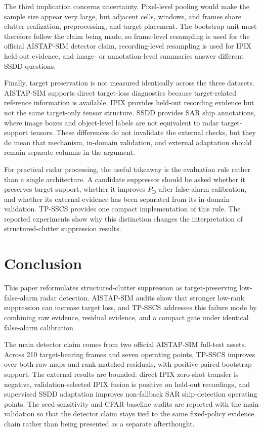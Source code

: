 \documentclass[journal]{IEEEtran}
\begin{document}
The third implication concerns uncertainty. Pixel-level pooling would make the sample size appear very large, but adjacent cells, windows, and frames share clutter realization, preprocessing, and target placement. The bootstrap unit must therefore follow the claim being made, so frame-level resampling is used for the official AISTAP-SIM detector claim, recording-level resampling is used for IPIX held-out evidence, and image- or annotation-level summaries answer different SSDD questions.

Finally, target preservation is not measured identically across the three datasets. AISTAP-SIM supports direct target-loss diagnostics because target-related reference information is available. IPIX provides held-out recording evidence but not the same target-only tensor structure. SSDD provides SAR ship annotations, where image boxes and object-level labels are not equivalent to radar target-support tensors. These differences do not invalidate the external checks, but they do mean that mechanism, in-domain validation, and external adaptation should remain separate columns in the argument.

For practical radar processing, the useful takeaway is the evaluation rule rather than a single architecture. A candidate suppressor should be asked whether it preserves target support, whether it improves $P_{\mathrm{D}}$ after false-alarm calibration, and whether its external evidence has been separated from its in-domain validation. TP-SSCS provides one compact implementation of this rule. The reported experiments show why this distinction changes the interpretation of structured-clutter suppression results.

\section{Conclusion}

This paper reformulates structured-clutter suppression as target-preserving low-false-alarm radar detection. AISTAP-SIM audits show that stronger low-rank suppression can increase target loss, and TP-SSCS addresses this failure mode by combining raw evidence, residual evidence, and a compact gate under identical false-alarm calibration.

The main detector claim comes from two official AISTAP-SIM full-test assets. Across 210 target-bearing frames and seven operating points, TP-SSCS improves over both raw maps and rank-matched residuals, with positive paired bootstrap support. The external results are bounded: direct IPIX zero-shot transfer is negative, validation-selected IPIX fusion is positive on held-out recordings, and supervised SSDD adaptation improves non-fallback SAR ship-detection operating points. The seed-sensitivity and CFAR-baseline audits are reported with the main validation so that the detector claim stays tied to the same fixed-policy evidence chain rather than being presented as a separate afterthought.
\end{document}
